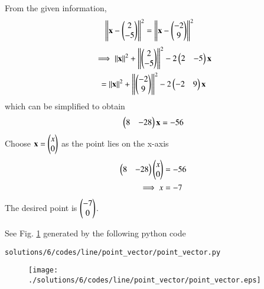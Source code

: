From the given information,
\begin{align}
\left\lVert\mathbf{x}-\begin{pmatrix}2\\-5\end{pmatrix}\right\rVert^2 &= \left\lVert\mathbf{x}-\begin{pmatrix}-2\\9\end{pmatrix}\right\rVert^2 
\end{align}
\begin{multline}
\implies \left\lVert\mathbf{x}\right\rVert^2+\left\lVert\begin{pmatrix}2\\-5\end{pmatrix}\right\rVert^2-2\begin{pmatrix}2 & -5\end{pmatrix}\mathbf{x} 
\\
= \left\lVert\mathbf{x}\right\rVert^2+\left\lVert\begin{pmatrix}-2\\9\end{pmatrix}\right\rVert^2-2\begin{pmatrix}-2 & 9\end{pmatrix}\mathbf{x} 
\end{multline}
which can be simplified to obtain
\begin{align}
\begin{pmatrix}8 & -28\end{pmatrix}\mathbf{x} = -56
\end{align}
Choose $\mathbf{x} = \begin{pmatrix}x\\0\end{pmatrix}$ as the point lies on the x-axis
\begin{align}
\begin{pmatrix}8 & -28\end{pmatrix}\begin{pmatrix}x\\0\end{pmatrix} &= -56
\\
\implies x &= -7
\end{align}
The desired point is $\begin{pmatrix}-7\\0\end{pmatrix}$.


See  Fig. \ref{fig:3.5.6line_1}  generated by the following python code 
\begin{lstlisting}
solutions/6/codes/line/point_vector/point_vector.py
\end{lstlisting}

\begin{figure}[!ht]
\centering
\texttt{[image: ./solutions/6/codes/line/point\_vector/point\_vector.eps]}
\caption{}
\label{fig:3.5.6line_1}
\end{figure}

